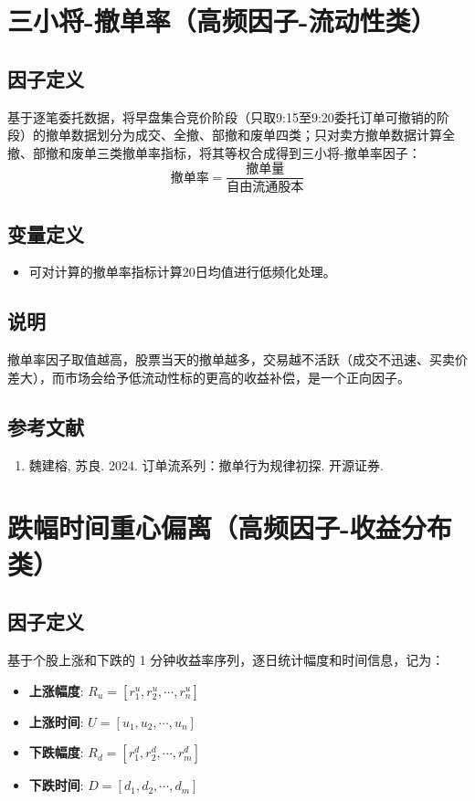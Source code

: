 \documentclass{article}
\begin{document}
\section{三小将-撤单率（高频因子-流动性类）}

\subsection{因子定义}
基于逐笔委托数据，将早盘集合竞价阶段（只取9:15至9:20委托订单可撤销的阶段）的撤单数据划分为成交、全撤、部撤和废单四类；只对卖方撤单数据计算全撤、部撤和废单三类撤单率指标，将其等权合成得到三小将-撤单率因子：
\begin{equation}
    \text{撤单率} = \frac{\text{撤单量}}{\text{自由流通股本}}
\end{equation}

\subsection{变量定义}
\begin{itemize}
    \item 可对计算的撤单率指标计算20日均值进行低频化处理。
\end{itemize}

\subsection{说明}
撤单率因子取值越高，股票当天的撤单越多，交易越不活跃（成交不迅速、买卖价差大），而市场会给予低流动性标的更高的收益补偿，是一个正向因子。

\subsection{参考文献}
\begin{enumerate}
    \item 魏建榕, 苏良. 2024. 订单流系列：撤单行为规律初探. 开源证券.
\end{enumerate}

\section{跌幅时间重心偏离（高频因子-收益分布类）}

\subsection{因子定义}
基于个股上涨和下跌的 1 分钟收益率序列，逐日统计幅度和时间信息，记为：
\begin{itemize}
    \item \textbf{上涨幅度}: \( R_u = [r_1^u, r_2^u, \cdots, r_n^u] \)
    \item \textbf{上涨时间}: \( U = [u_1, u_2, \cdots, u_n] \)
    \item \textbf{下跌幅度}: \( R_d = [r_1^d, r_2^d, \cdots, r_m^d] \)
    \item \textbf{下跌时间}: \( D = [d_1, d_2, \cdots, d_m] \)
\end{itemize}
\end{document}
